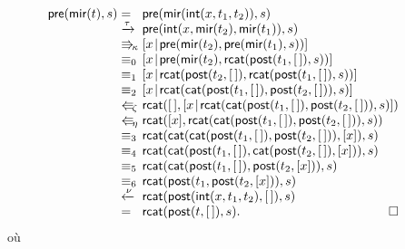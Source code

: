 \begin{equation*}
\begin{array}{@{}r@{\;}l@{\;}l@{\qquad}r@{}}
\fun{pre}(\fun{mir}(t),s)
& = & \fun{pre}(\fun{mir}(\fun{int}(x,t_1,t_2)),s)\\
& \xrightarrow{\smash{\tau}}
& \fun{pre}(\fun{int}(x,\fun{mir}(t_2),\fun{mir}(t_1)),s)\\
& \Rra{\kappa}
& \cons{x}{\fun{pre}(\fun{mir}(t_2),\fun{pre}(\fun{mir}(t_1),s))}\\
& \equiv_0
& \cons{x}{\fun{pre}(\fun{mir}(t_2),
           \fun{rcat}(\fun{post}(t_1,\el),s))}\\
& \equiv_1
& \cons{x}{\fun{rcat}(\fun{post}(t_2,\el),
           \fun{rcat}(\fun{post}(t_1,\el),s))}\\
& \equiv_2
& \cons{x}{\fun{rcat}(\fun{cat}(\fun{post}(t_1,\el),
                                 \fun{post}(t_2,\el)),
                      s)}\\
& \Lla{\zeta}
& \fun{rcat}(\el,\cons{x}{\fun{rcat}(\fun{cat}(\fun{post}(t_1,\el),
                                       \fun{post}(t_2,\el)),
                            s)})\\
& \Lla{\eta}
& \fun{rcat}([x],\fun{rcat}(\fun{cat}(\fun{post}(t_1,\el),
                                       \fun{post}(t_2,\el)),
                            s))\\
& \equiv_3
& \fun{rcat}(\fun{cat}(\fun{cat}(\fun{post}(t_1,\el),
                                  \fun{post}(t_2,\el)),
                       [x]),
             s)\\
& \equiv_4
& \fun{rcat}(\fun{cat}(\fun{post}(t_1,\el),
                       \fun{cat}(\fun{post}(t_2,\el),
                                 [x])),
             s)\\
& \equiv_5
& \fun{rcat}(\fun{cat}(\fun{post}(t_1,\el),
                       \fun{post}(t_2,[x])),
             s)\\
& \equiv_6
& \fun{rcat}(\fun{post}(t_1,\fun{post}(t_2,[x])),s)\\
& \xleftarrow{\smash{\nu}}
& \fun{rcat}(\fun{post}(\fun{int}(x,t_1,t_2),\el),s)\\
& =
& \fun{rcat}(\fun{post}(t,\el),s).\hfill\Box
\end{array}
\end{equation*}
où

